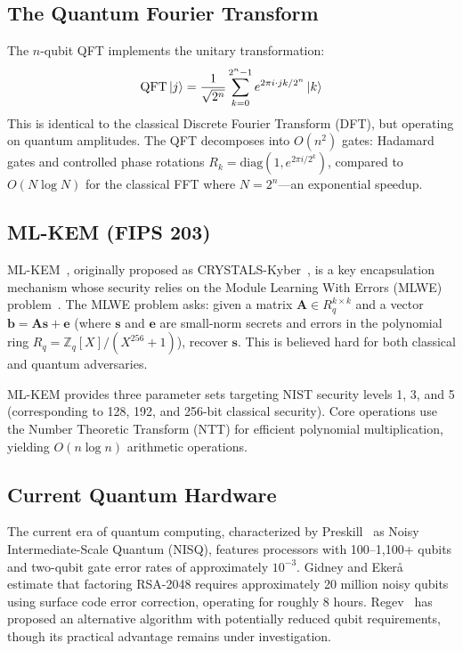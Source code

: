 \documentclass[conference]{IEEEtran}
\begin{document}
\subsection{The Quantum Fourier Transform}

The $n$-qubit QFT implements the unitary transformation:
\begin{equation}
\text{QFT}\ket{j} = \frac{1}{\sqrt{2^n}} \sum_{k=0}^{2^n - 1} e^{2\pi i \cdot jk / 2^n} \ket{k}
\end{equation}
This is identical to the classical Discrete Fourier Transform (DFT), but operating on quantum amplitudes. The QFT decomposes into $O(n^2)$ gates: Hadamard gates and controlled phase rotations $R_k = \text{diag}(1, e^{2\pi i / 2^k})$, compared to $O(N \log N)$ for the classical FFT where $N = 2^n$---an exponential speedup.

\subsection{ML-KEM (FIPS 203)}

ML-KEM~\cite{fips203}, originally proposed as CRYSTALS-Kyber~\cite{bos2018}, is a key encapsulation mechanism whose security relies on the Module Learning With Errors (MLWE) problem~\cite{lyubashevsky2010}. The MLWE problem asks: given a matrix $\mathbf{A} \in R_q^{k \times k}$ and a vector $\mathbf{b} = \mathbf{A}\mathbf{s} + \mathbf{e}$ (where $\mathbf{s}$ and $\mathbf{e}$ are small-norm secrets and errors in the polynomial ring $R_q = \mathbb{Z}_q[X]/(X^{256}+1)$), recover $\mathbf{s}$. This is believed hard for both classical and quantum adversaries.

ML-KEM provides three parameter sets targeting NIST security levels 1, 3, and 5 (corresponding to 128, 192, and 256-bit classical security). Core operations use the Number Theoretic Transform (NTT) for efficient polynomial multiplication, yielding $O(n \log n)$ arithmetic operations.

\subsection{Current Quantum Hardware}

The current era of quantum computing, characterized by Preskill~\cite{preskill2018} as Noisy Intermediate-Scale Quantum (NISQ), features processors with 100--1,100+ qubits and two-qubit gate error rates of approximately $10^{-3}$. Gidney and Eker\aa~\cite{gidney2021} estimate that factoring RSA-2048 requires approximately 20 million noisy qubits using surface code error correction, operating for roughly 8 hours. Regev~\cite{regev2023} has proposed an alternative algorithm with potentially reduced qubit requirements, though its practical advantage remains under investigation.
\end{document}
